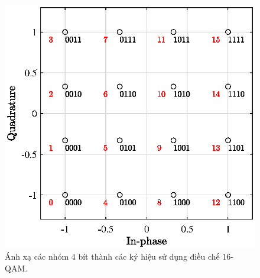 \begin{figure}[ht]
    \centering
    \includegraphics[width=.8\linewidth]{figures/qam16_con.eps}
    \caption{Ánh xạ các nhóm $4$ bít thành các ký hiệu sử dụng điều chế $16$-QAM.}
    \label{fig:mapping}
\end{figure}

